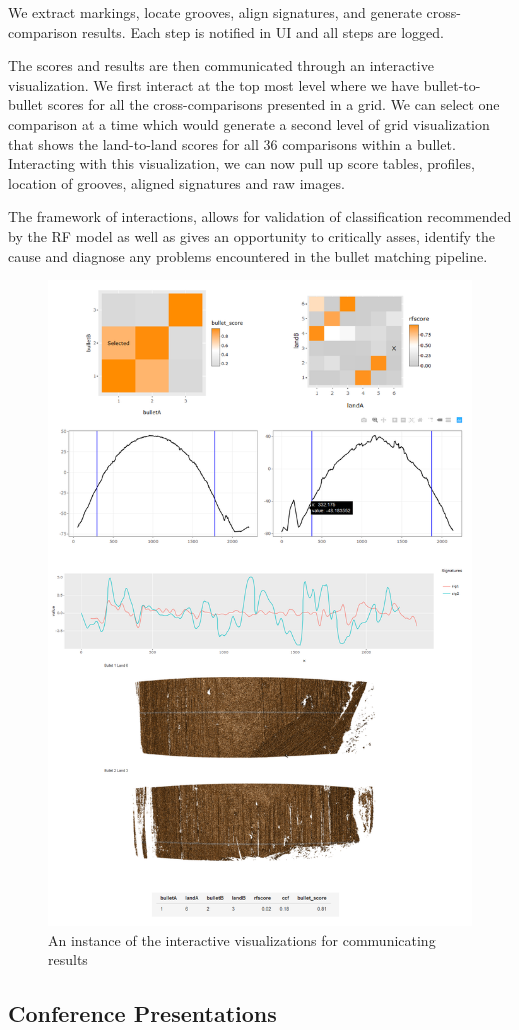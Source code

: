 \documentclass[]{book}
\begin{document}
We extract markings, locate grooves, align signatures, and generate cross-comparison results. Each step is notified in UI and all steps are logged.

The scores and results are then communicated through an interactive visualization. We first interact at the top most level where we have bullet-to-bullet scores for all the cross-comparisons presented in a grid. We can select one comparison at a time which would generate a second level of grid visualization that shows the land-to-land scores for all 36 comparisons within a bullet. Interacting with this visualization, we can now pull up score tables, profiles, location of grooves, aligned signatures and raw images.

The framework of interactions, allows for validation of classification recommended by the RF model as well as gives an opportunity to critically asses, identify the cause and diagnose any problems encountered in the bullet matching pipeline.

\begin{figure}

{\centering \includegraphics[width=0.5\linewidth]{images/bullets/gan-app2_consolidated} 

}

\caption{An instance of the interactive visualizations for communicating results}\label{fig:unnamed-chunk-27}
\end{figure}

\hypertarget{conference-presentations}{%
\subsection{Conference Presentations}\label{conference-presentations}}
\end{document}
